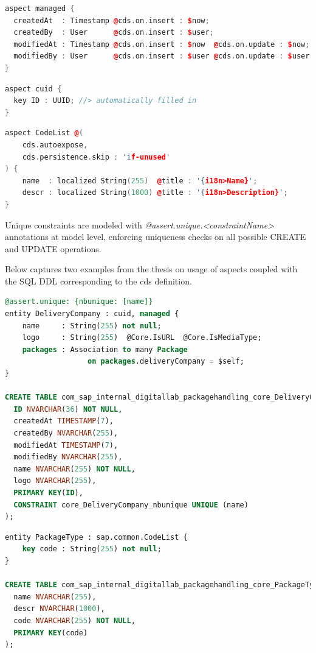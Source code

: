\begin{lstlisting}[language={c++}]
aspect managed {
  createdAt  : Timestamp @cds.on.insert : $now;
  createdBy  : User      @cds.on.insert : $user;
  modifiedAt : Timestamp @cds.on.insert : $now  @cds.on.update : $now;
  modifiedBy : User      @cds.on.insert : $user @cds.on.update : $user;
}
\end{lstlisting}

\begin{lstlisting}[language={c++}]
aspect cuid {
  key ID : UUID; //> automatically filled in
}
\end{lstlisting}

\begin{lstlisting}[language={c++}]
aspect CodeList @(
    cds.autoexpose,
    cds.persistence.skip : 'if-unused'
) {
    name  : localized String(255)  @title : '{i18n>Name}';
    descr : localized String(1000) @title : '{i18n>Description}';
}
\end{lstlisting}

Unique constraints are modeled with \textit{@assert.unique.<constraintName>} annotations at model level, enforcing uniqueness checks on all possible CREATE and UPDATE operations.

Below captures two examples from the thesis on usage of aspects coupled with the SQL DDL corresponding to the cds definition.
\begin{lstlisting}[language={sql}]
@assert.unique: {nbunique: [name]}
entity DeliveryCompany : cuid, managed {
    name     : String(255) not null;
    logo     : String(255)  @Core.IsURL  @Core.IsMediaType;
    packages : Association to many Package
                   on packages.deliveryCompany = $self;
}

CREATE TABLE com_sap_internal_digitallab_packagehandling_core_DeliveryCompany (
  ID NVARCHAR(36) NOT NULL,
  createdAt TIMESTAMP(7),
  createdBy NVARCHAR(255),
  modifiedAt TIMESTAMP(7),
  modifiedBy NVARCHAR(255),
  name NVARCHAR(255) NOT NULL,
  logo NVARCHAR(255),
  PRIMARY KEY(ID),
  CONSTRAINT core_DeliveryCompany_nbunique UNIQUE (name)
); 
\end{lstlisting}

\begin{lstlisting}[language={sql}]
entity PackageType : sap.common.CodeList {
    key code : String(255) not null;
}

CREATE TABLE com_sap_internal_digitallab_packagehandling_core_PackageType (
  name NVARCHAR(255),
  descr NVARCHAR(1000),
  code NVARCHAR(255) NOT NULL,
  PRIMARY KEY(code)
);
\end{lstlisting}
